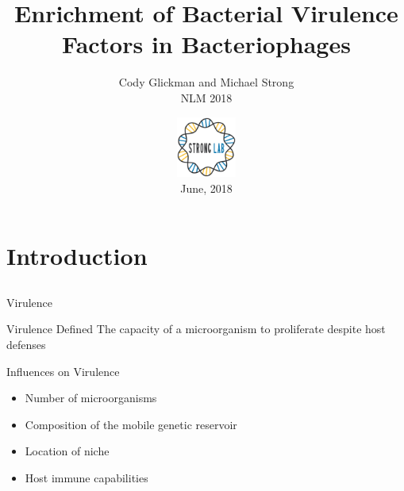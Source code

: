\documentclass[11pt]{beamer}
\author{Cody Glickman and Michael Strong \\ NLM 2018}
\title{Enrichment of Bacterial Virulence Factors in Bacteriophages}
\date{ \includegraphics[height=2cm, width=2cm]{lablogo.png} \\ June, 2018}
\begin{document}
	\maketitle


	
\section{Introduction}
\subsection{}

	\begin{frame}{Virulence}
		\begin{block}{Virulence Defined}
		The capacity of a microorganism to proliferate despite host defenses
		\end{block}
		
		\begin{block}{Influences on Virulence}
		\begin{itemize}
		\item Number of microorganisms
		\item \alert{Composition of the mobile genetic reservoir}
		\item Location of niche
		\item Host immune capabilities
		\end{itemize}
		\end{block}
	
	\end{frame}
\end{document}
